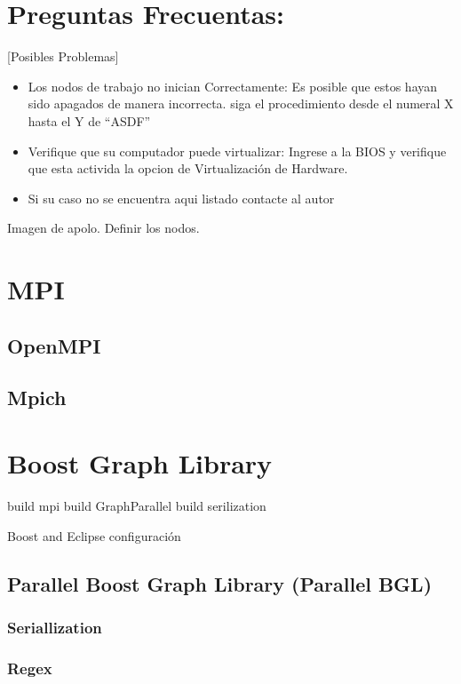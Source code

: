 \section{Preguntas Frecuentas:}[Posibles Problemas]

\begin{itemize}
	\item Los nodos de trabajo no inician Correctamente: Es posible que estos hayan sido apagados de manera incorrecta. 
	siga el procedimiento desde el numeral X hasta el Y de ``ASDF''

	\item Verifique que su computador puede virtualizar: Ingrese a la BIOS y verifique que esta activida la opcion de Virtualización de Hardware. 

	\item Si su caso no se encuentra aqui listado contacte al autor
\end{itemize}





Imagen de apolo.
Definir los nodos.

\section{MPI}

\subsection{OpenMPI}
\subsection{Mpich}

\section{Boost Graph Library}

	build mpi
	build GraphParallel
	build serilization

Boost and Eclipse
	configuración
	
\subsection{Parallel Boost Graph Library (Parallel BGL) }
\subsubsection{Seriallization}
\subsubsection{Regex}
